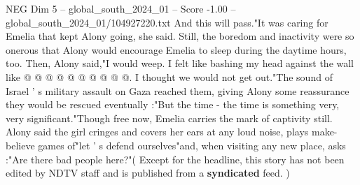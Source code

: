 \begin{textsample}{NEG Dim 5 – global\_south\_2024\_01 – Score -1.00 – global\_south\_2024\_01/104927220.txt}
And this will pass."It was caring for Emelia that kept Alony going, she said.
Still, the boredom and inactivity were so onerous that Alony would encourage Emelia to sleep during the daytime hours, too.
Then, Alony said,"I would weep.
I felt like bashing my head against the wall like @ @ @ @ @ @ @ @ @ @.
I thought we would not get out."The sound of Israel ' s military assault on Gaza reached them, giving Alony some reassurance they would be rescued eventually :"But the time - the time is something very, very significant."Though free now, Emelia carries the mark of captivity still.
Alony said the girl cringes and covers her ears at any loud noise, plays make-believe games of"let ' s defend ourselves"and, when visiting any new place, asks :"Are there bad people here?"( Except for the headline, this story has not been edited by NDTV staff and is published from a \textbf{syndicated} feed. )

\end{textsample}
